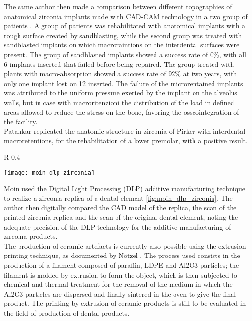 The same author then made a comparison between different topographies of anatomical zirconia implants made with CAD-CAM technology in a two group of patients \parencite{Reference87}. A group of patients was rehabilitated with anatomical implants with a rough surface created by sandblasting, while the second group was treated with sandblasted implants on which macroraintions on the interdental surfaces were present. The group of sandblasted implants showed a success rate of 0\%, with all 6 implants inserted that failed before being repaired. The group treated with plants with macro-absorption showed a success rate of 92\% at two years, with only one implant lost on 12 inserted. The failure of the microrentained implants was attributed to the uniform pressure exerted by the implant on the alveolus walls, but in case with macroritenzioni the distribution of the load in defined areas allowed to reduce the stress on the bone, favoring the osseointegration of the facility. \\
Patankar \parencite{Reference88} replicated the anatomic structure in zirconia of Pirker with interdental macroretentions, for the rehabilitation of a lower premolar, with a positive result.

\begin{wrapfigure} {R} {0.4\textwidth}
\vspace{-20pt}
	\begin{center}
	\texttt{[image: moin\_dlp\_zirconia]}
    \caption{a sinistra modello CAD dell'elemento dentario. A destra modello dentario  in zirconia stampato stampato con tecnica DLP. Da \emph{Moin et al} \parencite{Reference89}}
    \label{fig:moin_dlp_zirconia}
    \end{center}
\vspace{-20pt}
\end{wrapfigure}

Moin \parencite{Reference89} used the Digital Light Processing (DLP) additive manufacturing technique to realize a zirconia replica of a dental element \ref{fig:moin_dlp_zirconia}. The author then digitally compared the CAD model of the replica, the scan of the printed zirconia replica and the scan of the original dental element, noting the adequate precision of the DLP technology for the additive manufacturing of zirconia products. \\
The production of ceramic artefacts is currently also possible using the extrusion printing technique, as documented by Nötzel \parencite{Reference97}. The process used consists in the production of a filament composed of paraffin, LDPE and Al2O3 particles; the filament is molded by extrusion to form the object, which is then subjected to chemical and thermal treatment for the removal of the medium in which the Al2O3 particles are dispersed and finally sintered in the oven to give the final product. The printing by extrusion of ceramic products is still to be evaluated in the field of production of dental products. \\


